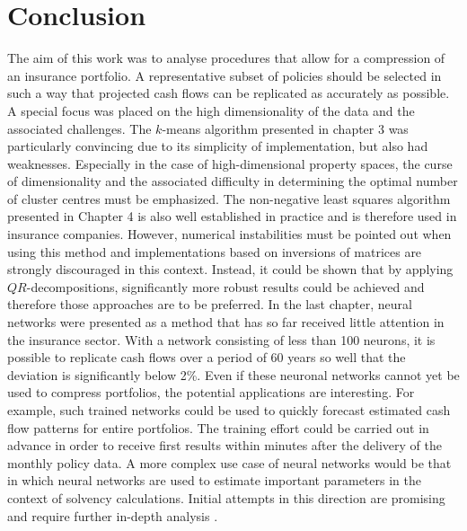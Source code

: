 

\chapter{Conclusion}
\label{cha:Conclusion}

The aim of this work was to analyse procedures that allow for a compression of an insurance portfolio. A representative subset of policies should be selected in such a way that projected cash flows can be replicated as accurately as possible. A special focus was placed on the high dimensionality of the data and the associated challenges. The $k$-means algorithm presented in chapter 3 was particularly convincing due to its simplicity of implementation, but also had weaknesses. Especially in the case of high-dimensional property spaces, the curse of dimensionality and the associated difficulty in determining the optimal number of cluster centres must be emphasized. The non-negative least squares algorithm presented in Chapter 4 is also well established in practice and is therefore used in insurance companies.  However, numerical instabilities must be pointed out when using this method and implementations based on inversions of matrices are strongly discouraged in this context. Instead, it could be shown that by applying $QR$-decompositions, significantly more robust results could be achieved and therefore those approaches are to be preferred. In the last chapter, neural networks were presented as a method that has so far received little attention in the insurance sector. With a network consisting of less than 100 neurons, it is possible to replicate cash flows over a period of 60 years so well that the deviation is significantly below 2\%. Even if these neuronal networks cannot yet be used to compress portfolios, the potential applications are interesting. For example, such trained networks could be used to quickly forecast estimated cash flow patterns for entire portfolios. The training effort could be carried out in advance in order to receive first results within minutes after the delivery of the monthly policy data. A more complex use case of neural networks would be that in which neural networks are used to estimate important parameters in the context of solvency calculations. Initial attempts in this direction are promising and require further in-depth analysis \cite{slides}.